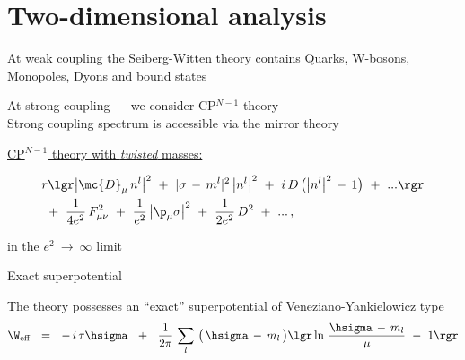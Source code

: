 \documentclass{beamer}
\begin{document}
\section{Two-dimensional analysis}


\begin{frame}{}

	At weak coupling the Seiberg-Witten theory contains
	\alert{Quarks}, \alert{W-bosons}, \alert{Monopoles}, \alert{Dyons} and \alert{bound states}

\vspace{7mm}
	At strong coupling --- we consider CP$^{N-1}$ theory\\
	Strong coupling spectrum is accessible via the mirror theory
\end{frame}


\begin{frame}[t]{}

\vspace{2mm}
	\underline{CP$^{N-1}$ theory with {\it twisted} masses:}

\begin{align*}
%
	&
	r \lgr \big| \mc{D}_\mu \, n^l \big|^2  ~+~ | \sigma \,-\, m^l |^2 \, \big| n^l \big|^2 
		~+~ i\, D\, \big( \big| n^l \big|^2 \,-\, 1 \big) ~+~ ... \rgr
	\\
%
	&
	~+~ \frac{1}{4e^2}\, F_{\mu\nu}^2 ~+~ \frac{1}{e^2}\, \big|\p_\mu \sigma\big|^2 
	~+~ \frac{1}{2e^2}\, D^2 ~+~ ...\,,
\end{align*}

	in the $ e^2 ~\to~ \infty $ limit

\vspace{7mm}
\end{frame}


\begin{frame}{Exact superpotential}

	The theory possesses an ``exact'' superpotential of
	Veneziano-Yankielowicz type
\[
	\W_\text{eff} ~~=~~ -\,i\,\tau\hsigma
			~~+~~ \frac{1}{2\pi}\, \sum_l\, \big( \,\hsigma \,-\, m_l\, \big)
				\lgr \ln\, \frac{\hsigma \,-\, m_l}{\mu} ~-~ 1 \rgr
\]

\end{frame}
\end{document}
